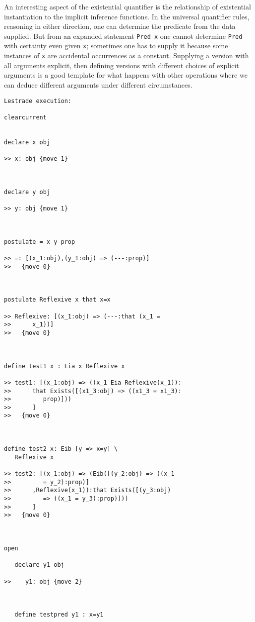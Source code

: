 \documentclass{article}
\begin{document}
An interesting aspect of the existential quantifier is the relationship of existential instantiation to the implicit inference functions.  In the universal quantifier rules, reasoning in either direction, one can determine the predicate from the data supplied.  But from an expanded statement {\tt Pred x} one cannot determine {\tt Pred} with certainty even given {\tt x};  sometimes one has to supply it because some instances of {\tt x} are accidental occurrences as a constant.  Supplying a version with all arguments explicit, then defining versions with different choices of explicit arguments is a good template for what happens with other operations where we can deduce different arguments under different circumstances.

\begin{verbatim}Lestrade execution:

clearcurrent


declare x obj

>> x: obj {move 1}



declare y obj

>> y: obj {move 1}



postulate = x y prop

>> =: [(x_1:obj),(y_1:obj) => (---:prop)]
>>   {move 0}



postulate Reflexive x that x=x

>> Reflexive: [(x_1:obj) => (---:that (x_1 =
>>      x_1))]
>>   {move 0}



define test1 x : Eia x Reflexive x

>> test1: [(x_1:obj) => ((x_1 Eia Reflexive(x_1)):
>>      that Exists([(x1_3:obj) => ((x1_3 = x1_3):
>>         prop)]))
>>      ]
>>   {move 0}



define test2 x: Eib [y => x=y] \
   Reflexive x

>> test2: [(x_1:obj) => (Eib([(y_2:obj) => ((x_1
>>         = y_2):prop)]
>>      ,Reflexive(x_1)):that Exists([(y_3:obj)
>>         => ((x_1 = y_3):prop)]))
>>      ]
>>   {move 0}



open

   declare y1 obj

>>    y1: obj {move 2}



   define testpred y1 : x=y1


\end{verbatim}
\end{document}
